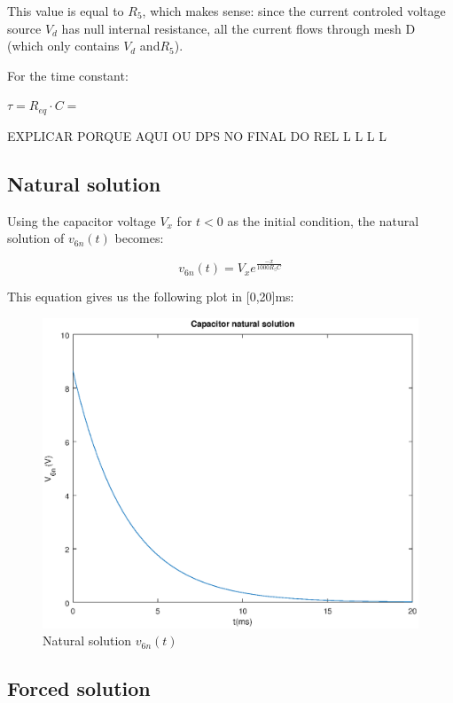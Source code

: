 This value is equal to $R_5$, which makes sense: since the current controled voltage source $V_d$ has null internal resistance,  all the current flows through mesh D (which only contains $V_d$ and$R_5$).


For the time constant:

$\tau = R_{eq} \cdot C = $


EXPLICAR PORQUE AQUI OU DPS NO FINAL DO REL
L
L
L
L



\subsection{Natural solution}

Using the capacitor voltage $V_x$ for $t<0$ as the initial condition, the natural solution of $v_{6n}(t)$ becomes:

\begin{equation}
\label{eq:solucaonatural}
v_{6n}(t)=V_x e^{\frac{-x}{1000R_5C}}
\end{equation}

This equation gives us the following plot in [0,20]ms:

  \begin{figure}[H] \centering
    \includegraphics[width=1\linewidth]{natural.eps}
    \caption{Natural solution $v_{6n}(t)$}
    \label{fig:natural}
    \end{figure}



\subsection{Forced solution}


